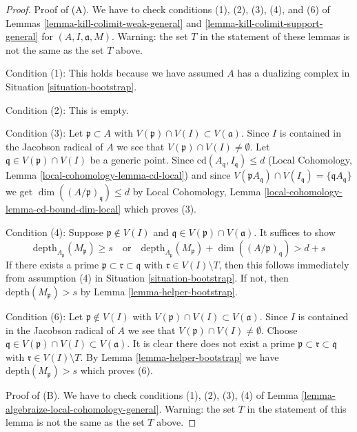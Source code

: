 \begin{proof}
\medskip\noindent
Proof of (A). We have to check conditions (1), (2), (3), (4), and (6)
of Lemmas \ref{lemma-kill-colimit-weak-general} and
\ref{lemma-kill-colimit-support-general} for
$(A, I, \mathfrak a, M)$. Warning: the set $T$ in the statement of
these lemmas is not the same as the set $T$ above.

\medskip\noindent
Condition (1): This holds because we have assumed $A$ has a dualizing complex in
Situation \ref{situation-bootstrap}.

\medskip\noindent
Condition (2): This is empty.

\medskip\noindent
Condition (3): Let $\mathfrak p \subset A$ with
$V(\mathfrak p) \cap V(I) \subset V(\mathfrak a)$.
Since $I$ is contained in the Jacobson radical of $A$ we see
that $V(\mathfrak p) \cap V(I) \not = \emptyset$.
Let $\mathfrak q \in V(\mathfrak p) \cap V(I)$ be a generic point.
Since $\text{cd}(A_\mathfrak q, I_\mathfrak q) \leq d$
(Local Cohomology, Lemma \ref{local-cohomology-lemma-cd-local}) and since
$V(\mathfrak p A_\mathfrak q) \cap V(I_\mathfrak q) =
\{\mathfrak q A_\mathfrak q\}$ we get
$\dim((A/\mathfrak p)_\mathfrak q) \leq d$ by Local Cohomology,
Lemma \ref{local-cohomology-lemma-cd-bound-dim-local} which proves (3).

\medskip\noindent
Condition (4): Suppose $\mathfrak p \not \in V(I)$ and
$\mathfrak q \in V(\mathfrak p) \cap V(\mathfrak a)$.
It suffices to show
$$
\text{depth}_{A_\mathfrak p}(M_\mathfrak p) \geq s
\quad\text{or}\quad
\text{depth}_{A_\mathfrak p}(M_\mathfrak p) +
\dim((A/\mathfrak p)_\mathfrak q) > d + s
$$
If there exists a prime $\mathfrak p \subset \mathfrak r \subset \mathfrak q$
with $\mathfrak r \in V(I) \setminus T$, then this follows
immediately from assumption (4) in Situation \ref{situation-bootstrap}.
If not, then $\text{depth}(M_\mathfrak p) > s$ by
Lemma \ref{lemma-helper-bootstrap}.

\medskip\noindent
Condition (6): Let $\mathfrak p \not \in V(I)$ with
$V(\mathfrak p) \cap V(I) \subset V(\mathfrak a)$.
Since $I$ is contained in the Jacobson radical of $A$ we see
that $V(\mathfrak p) \cap V(I) \not = \emptyset$.
Choose $\mathfrak q \in V(\mathfrak p) \cap V(I) \subset V(\mathfrak a)$.
It is clear there does not exist a prime
$\mathfrak p \subset \mathfrak r \subset \mathfrak q$
with $\mathfrak r \in V(I) \setminus T$.
By Lemma \ref{lemma-helper-bootstrap} we have
$\text{depth}(M_\mathfrak p) > s$ which proves (6).

\medskip\noindent
Proof of (B). We have to check conditions (1), (2), (3), (4) of
Lemma \ref{lemma-algebraize-local-cohomology-general}. Warning:
the set $T$ in the statement of
this lemma is not the same as the set $T$ above.


\end{proof}

